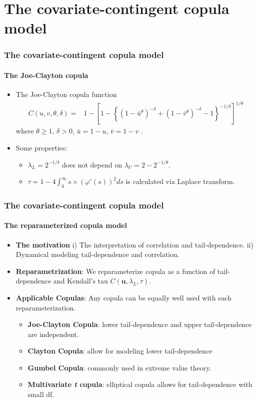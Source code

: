 \documentclass{beamer}
\begin{document}
\section{The covariate-contingent copula model}
\begin{frame}
  \frametitle{The covariate-contingent copula model}
  \framesubtitle{The Joe-Clayton copula}
  \begin{itemize}
  \item The Joe-Clayton copula function
    \[
    \begin{split}
      C(u,v,\theta,\delta)=&1-\left[1-\left\{\left(1-\bar u ^{\theta }\right)^{-\delta
          }+\left(1-\bar v ^{\theta }\right)^{-\delta }-1\right\}^{-1/\delta
        }\right]^{1/\theta }
    \end{split}
    \]
    where $\theta \geq 1$, $\delta > 0$, $\bar u = 1-u$, $\bar v = 1-v$ .

  \item Some properties:
    \begin{itemize}
    \item $\lambda_L=2^{-1/\delta}$ does not depend on $\lambda_U=2-2^{-1/\theta}$.
    \item  $\tau=1- 4\int _0^{\infty} s\times(\varphi'(s))^2ds$ is calculated via Laplace transform.
    \end{itemize}
  \end{itemize}

\end{frame}


\begin{frame}
  \frametitle{The covariate-contingent copula model}
  \framesubtitle{The reparameterized copula model}
  \begin{itemize}

  \item \textbf{The motivation} i) The interpretation of correlation and tail-dependence.
    ii) Dynamical modeling tail-dependence and correlation.

  \item \textbf{Reparametrization}: We reparameterize copula as a function of
    tail-dependence and Kendall's tau $C(\bm{u},\lambda_L,\tau)$.
  \item \textbf{Applicable Copulas}: Any copula can be equally well used with such
    reparameterization.

    \begin{itemize}
    \item \textbf{Joe-Clayton Copula}: lower tail-dependence and upper tail-dependence are
      independent.

    \item \textbf{Clayton Copula}: allow for modeling lower tail-dependence

    \item \textbf{Gumbel Copula}: commonly used in extreme value theory.
    \item \textbf{Multivariate \emph{t} copula}: elliptical copula allows for
      tail-dependence with small df.
    \end{itemize}

  \end{itemize}
\end{frame}
\end{document}
